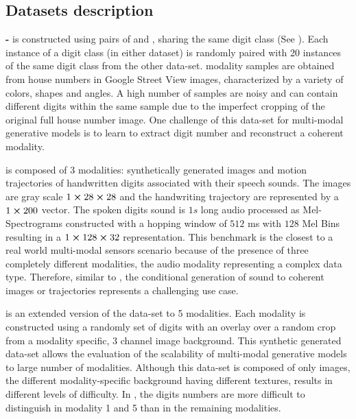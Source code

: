 


\subsection{Datasets description}

\textbf{\mnist-\svhn}  \cite{mmvaeShi2019} is constructed using pairs of \mnist and \svhn, sharing the same digit class (See ). Each instance of a digit class (in either dataset) is randomly paired with 20 instances of the same digit class from the other data-set. \svhn modality samples are obtained from house numbers in Google Street View images, characterized by a variety of colors, shapes and  angles. A high number of \svhn samples are noisy and can contain different digits within the same sample due to the imperfect cropping of the original full house number image. One challenge of this data-set for multi-modal generative models is to learn to extract digit number and reconstruct a coherent \mnist modality.

\textbf{\mhd}  \cite{Vasco2022} is composed of 3 modalities: synthetically generated images and motion trajectories of handwritten digits associated with their speech sounds. The images are gray scale $1 \cross 28 \cross 28$ and the handwriting trajectory are represented by a $1 \cross 200$ vector. The spoken digits sound is $1s$ long audio processed as Mel-Spectrograms constructed with a hopping window of $512$ ms with $128$ Mel Bins  resulting in a $1 \cross 128 \cross 32$ representation. This benchmark is the closest to a real world multi-modal sensors scenario because of the presence of three completely different modalities, the audio modality representing a complex data type. Therefore, similar to \svhn, the conditional generation of sound to coherent images or trajectories represents a challenging use case.

\textbf{\polymnist} \cite{sutter2021generalized} is an extended version of the \mnist data-set to 5 modalities. Each modality is constructed using a randomly set of \mnist digits with an overlay over a random crop from a modality specific, 3 channel image background. This synthetic generated data-set allows the evaluation of the scalability of multi-modal generative models to large number of modalities. Although this data-set is composed of only images, the different modality-specific background having different textures, results in different levels of difficulty. In , the digits numbers are more difficult to distinguish in modality 1 and 5 than in the remaining modalities.


